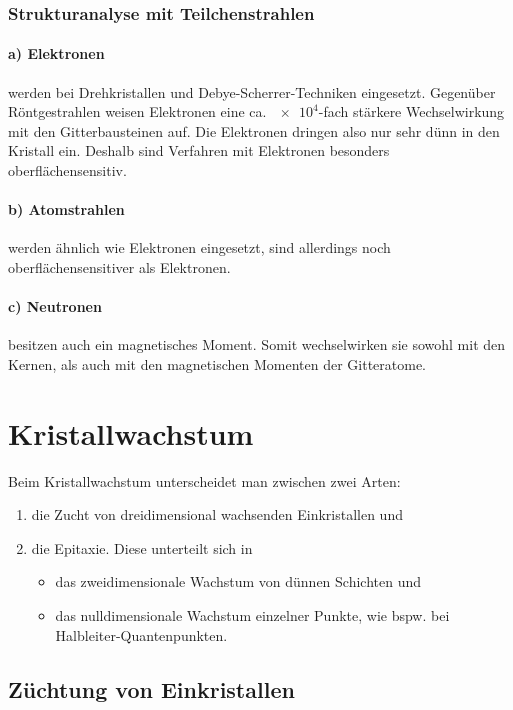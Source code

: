 \subsubsection{Strukturanalyse mit Teilchenstrahlen}

\paragraph{a) Elektronen} werden bei Drehkristallen und Debye-Scherrer-Techniken eingesetzt. Gegenüber Röntgestrahlen weisen Elektronen eine ca. $\num{e4}$-fach stärkere Wechselwirkung mit den Gitterbausteinen auf. 
    Die Elektronen dringen also nur sehr dünn in den Kristall ein. 
    Deshalb sind Verfahren mit Elektronen besonders oberflächensensitiv.

\paragraph{b) Atomstrahlen} werden ähnlich wie Elektronen eingesetzt, sind allerdings noch oberflächensensitiver als Elektronen.

\paragraph{c) Neutronen} besitzen auch ein magnetisches Moment. Somit wechselwirken sie sowohl mit den Kernen, als auch mit den magnetischen Momenten der Gitteratome.

\section{Kristallwachstum}
    Beim Kristallwachstum unterscheidet man zwischen zwei Arten: 
    \begin{enumerate}
        \item die Zucht von dreidimensional wachsenden Einkristallen und
        \item die Epitaxie. Diese unterteilt sich in
        \begin{itemize}
            \item das zweidimensionale Wachstum von dünnen Schichten und
            \item das nulldimensionale Wachstum einzelner Punkte, wie bspw. bei Halbleiter-Quantenpunkten.
        \end{itemize}
    \end{enumerate}

\subsection{Züchtung von Einkristallen}

